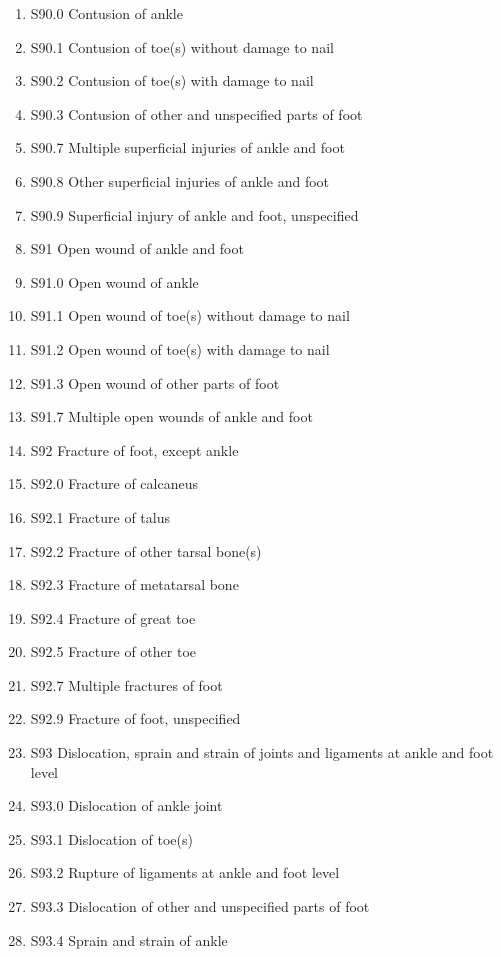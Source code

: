 \documentclass[
]{scrartcl}
\begin{document}
\begin{itemize}
\begin{enumerate}
  \item
    S90.0 Contusion of ankle
  \item
    S90.1 Contusion of toe(s) without damage to nail
  \item
    S90.2 Contusion of toe(s) with damage to nail
  \item
    S90.3 Contusion of other and unspecified parts of foot
  \item
    S90.7 Multiple superficial injuries of ankle and foot
  \item
    S90.8 Other superficial injuries of ankle and foot
  \item
    S90.9 Superficial injury of ankle and foot, unspecified
  \item
    S91 Open wound of ankle and foot
  \item
    S91.0 Open wound of ankle
  \item
    S91.1 Open wound of toe(s) without damage to nail
  \item
    S91.2 Open wound of toe(s) with damage to nail
  \item
    S91.3 Open wound of other parts of foot
  \item
    S91.7 Multiple open wounds of ankle and foot
  \item
    S92 Fracture of foot, except ankle
  \item
    S92.0 Fracture of calcaneus
  \item
    S92.1 Fracture of talus
  \item
    S92.2 Fracture of other tarsal bone(s)
  \item
    S92.3 Fracture of metatarsal bone
  \item
    S92.4 Fracture of great toe
  \item
    S92.5 Fracture of other toe
  \item
    S92.7 Multiple fractures of foot
  \item
    S92.9 Fracture of foot, unspecified
  \item
    S93 Dislocation, sprain and strain of joints and ligaments at ankle
    and foot level
  \item
    S93.0 Dislocation of ankle joint
  \item
    S93.1 Dislocation of toe(s)
  \item
    S93.2 Rupture of ligaments at ankle and foot level
  \item
    S93.3 Dislocation of other and unspecified parts of foot
  \item
    S93.4 Sprain and strain of ankle

\end{enumerate}
\end{itemize}
\end{document}

